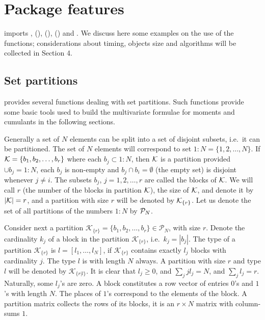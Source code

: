 \hypertarget{package-features}{%
\section{Package features}\label{package-features}}

 imports ,  (\citet{Mass02}),  (\citet{Matrix24}),  (\citet{MVT09}) and . We discuss here some examples on the use of the functions; considerations about timing, objects size and algorithms will be collected in Section 4.

\hypertarget{set-partitions}{%
\subsection{Set partitions}\label{set-partitions}}

 provides several functions dealing with set partitions. Such functions provide some basic tools used to build the multivariate formulae for moments and cumulants in the following sections.

Generally a set of \(N\) elements can be split into a set of disjoint subsets, i.e.~it can be partitioned. The set of \(N\) elements will correspond to set \(1 : N = \{1, 2, \dots ,N\}\). If \({\cal{K}} = \{b_1, b_2, \dots , b_r \}\) where each \(b_j \subset 1 : N\), then \({\cal{K}}\) is a partition provided
\(\cup b_j = 1 : N\), each \(b_j\) is non-empty and \(b_j \cap b_i = \emptyset\) (the empty set) is disjoint
whenever \(j \neq i\). The subsets \(b_j\), \(j = 1, 2, \dots, r\) are called the blocks of \(\cal{K}\). We
will call \(r\) (the number of the blocks in partition \(\cal{K}\)), the size of \(\cal{K}\), and denote it by \(|{\cal{K}}| = r\), and a partition with size \(r\) will be denoted by \({\cal{K}}_{\{r\}}\). Let us denote the set
of all partitions of the numbers \(1 : N\) by \({\cal{P}}_N\).

Consider next a partition \({\mathcal{K}}_{\{r\}}=\{b_{1},b_{2},\dots,b_{r}\}\in {\mathcal{P}}_{N}\), with size \(r\). Denote the cardinality \(k_{j}\)
of a block in the partition \({\mathcal{K}}_{\{r\}}\), i.e.~\(k_{j}=|b_{j}|\).
The type of a partition \({\mathcal{K}}_{\{r\}}\) is \(l=[l_{1},\dots ,l_{N}]\),
if \({\mathcal{K}}_{\{r\}}\) contains exactly \(l_{j}\) blocks with cardinality \(j\). The type \(l\) is with length \(N\) always. A partition with size \(r\) and
type \(l\) will be denoted by \({\mathcal{K}}_{\{r|l\}}\). It is clear that
\(l_{j}\geq 0\), and \(\sum_{j}jl_{j}=N\), and \(\sum_{j}l_{j}=r\). Naturally, some
\(l_{j}\)'s are zero. A block constitutes a row vector of entries \(0\)'s and \(1\)'s with length \(N\). The places of \(1\)'s correspond to the elements of the block. A partition matrix collects the rows of its blocks, it is an \(r\times N\) matrix with column-sums \(1\).

